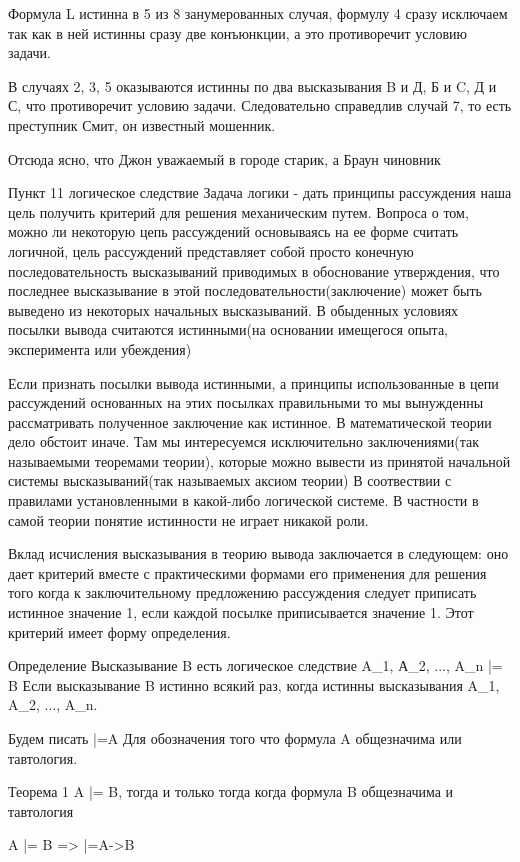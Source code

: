 Формула L истинна в 5 из 8 занумерованных случая, формулу 4 сразу исключаем так как в ней истинны сразу две конъюнкции, а это противоречит условию задачи.

В случаях 2, 3, 5 оказываются истинны по два высказывания B и Д, Б и C, Д и С, что противоречит условию задачи.
Следовательно справедлив случай 7, то есть преступник Смит, он известный мошенник.

Отсюда ясно, что Джон уважаемый в городе старик, а Браун чиновник

Пункт 11 логическое следствие
Задача логики - дать принципы рассуждения наша цель получить критерий для решения механическим путем. Вопроса о том, можно ли некоторую цепь рассуждений основываясь на ее форме считать логичной, цель рассуждений представляет собой просто конечную последовательность высказываний приводимых в обоснование утверждения, что последнее высказывание в этой последовательности(заключение) может быть выведено из некоторых начальных высказываний. В обыденных условиях посылки вывода считаются истинными(на основании имещегося опыта, эксперимента или убеждения)

Если признать посылки вывода истинными, а принципы использованные в цепи рассуждений основанных на этих посылках правильными
то мы вынужденны рассматривать полученное заключение как истинное. В математической теории дело обстоит иначе. Там мы интересуемся исключительно заключениями(так называемыми теоремами теории), которые можно вывести из принятой начальной системы высказываний(так называемых аксиом теории) В соотвествии с правилами установленными в какой-либо логической системе. В частности в самой теории понятие истинности не играет никакой роли.

Вклад исчисления высказывания в теорию вывода заключается в следующем: оно дает критерий вместе с практическими формами его применения для решения того когда к заключительному предложению рассуждения следует приписать истинное значение 1, если каждой посылке приписывается значение 1. Этот критерий имеет форму определения.

Определение
Высказывание B есть логическое следствие A_1, А_2, ..., A_n |= B Если высказывание B истинно всякий раз, когда истинны высказывания A_1, A_2, ..., A_n.

Будем писать |=A Для обозначения того что формула A общезначима или тавтология.


Теорема 1
A |= B, тогда и только тогда когда формула B общезначима и тавтология

A |= B => |=A->B

